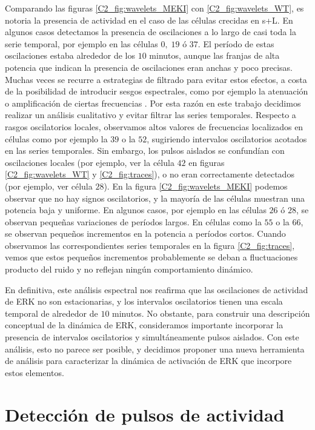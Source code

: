 \documentclass[./main.tex]{subfiles}
\begin{document}
Comparando las figuras \ref{C2_fig:wavelets_MEKI} con \ref{C2_fig:wavelets_WT}, es notoria la presencia de actividad en el caso de las células crecidas en s+L. En algunos casos detectamos la presencia de oscilaciones a lo largo de casi toda la serie temporal, por ejemplo en las células $0,\; 19$ ó $37$. El período de estas oscilaciones estaba alrededor de los $10$ minutos, aunque las franjas de alta potencia que indican la presencia de oscilaciones eran anchas y poco precisas. Muchas veces se recurre a estrategias de filtrado para evitar estos efectos, a costa de la posibilidad de introducir sesgos espectrales, como por ejemplo la atenuación o amplificación de ciertas frecuencias \cite{Monke2020}. Por esta razón en este trabajo decidimos realizar un análisis cualitativo y evitar filtrar las series temporales. Respecto a rasgos oscilatorios locales, observamos altos valores de frecuencias localizados en células como por ejemplo la $39$ o la $52$, sugiriendo intervalos oscilatorios acotados en las series temporales. Sin embargo, los pulsos aislados se confundían con oscilaciones locales (por ejemplo, ver la célula $42$ en figuras \ref{C2_fig:wavelets_WT} y \ref{C2_fig:traces}), o no eran correctamente detectados (por ejemplo, ver célula $28$). En la figura \ref{C2_fig:wavelets_MEKI} podemos observar que no hay signos oscilatorios, y la mayoría de las células muestran una potencia baja y uniforme. En algunos casos, por ejemplo en las células $26$ ó $28$, se observan pequeñas variaciones de períodos largos. En células como la $55$ o la $66$, se observan pequeños incrementos en la potencia a períodos cortos. Cuando observamos las correspondientes series temporales en la figura \ref{C2_fig:traces}, vemos que estos pequeños incrementos probablemente se deban a fluctuaciones producto del ruido y no reflejan ningún comportamiento dinámico. 


En definitiva, este análisis espectral nos reafirma que las oscilaciones de actividad de ERK no son estacionarias, y los intervalos oscilatorios tienen una escala temporal de alrededor de $10$ minutos. No obstante, para construir una descripción conceptual de la dinámica de ERK, consideramos importante incorporar la presencia de intervalos oscilatorios y simultáneamente pulsos aislados. Con este análisis, esto no parece ser posible, y decidimos proponer una nueva herramienta de análisis para caracterizar la dinámica de activación de ERK que incorpore estos elementos. 


\section{Detección de pulsos de actividad}
\label{C2_sec:pulse_detection}
\end{document}
